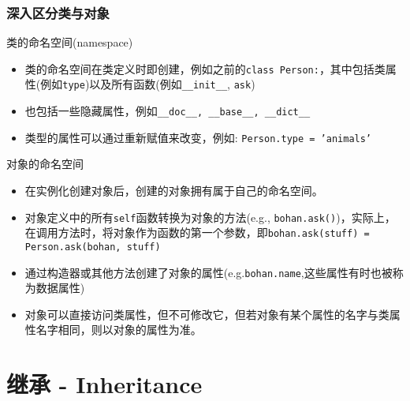 \documentclass[9pt]{beamer}
\begin{document}
\begin{frame}
    \frametitle{深入区分类与对象}

    \begin{block}{类的命名空间(namespace)}

        \begin{itemize}
            \item 类的命名空间在类定义时即创建，例如之前的\texttt{class Person:}，其中包括类属性(例如\texttt{type})以及所有函数(例如\texttt{__init__}, \texttt{ask})
            \item 也包括一些隐藏属性，例如\texttt{__doc__, __base__, __dict__}
            \item 类型的属性可以通过重新赋值来改变，例如: \texttt{Person.type = 'animals'}
        \end{itemize}
        
    \end{block}

    \begin{block}{对象的命名空间}
        \begin{itemize}
            \item 在实例化创建对象后，创建的对象拥有属于自己的命名空间。
            \item 对象定义中的所有\texttt{self}函数转换为对象的方法(e.g., \texttt{bohan.ask()})，实际上，在调用方法时，将对象作为函数的第一个参数，即\texttt{bohan.ask(stuff) = Person.ask(bohan, stuff)}
            \item 通过构造器或其他方法创建了对象的属性(e.g.\texttt{bohan.name},这些属性有时也被称为数据属性)
            \item 对象可以直接访问类属性，但不可修改它，但若对象有某个属性的名字与类属性名字相同，则以对象的属性为准。
        \end{itemize}
    \end{block}

\end{frame}


\section{继承 - Inheritance}
\end{document}
